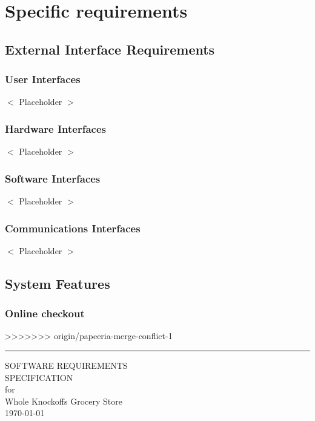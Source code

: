 \documentclass{scrreprt}
\theoremstyle{funreq}
\def\myversion{1.0 }
\begin{document}
{\let\clearpage\relax 
\chapter{Specific requirements}}

\section{External Interface Requirements}

\subsection{User Interfaces}
$<$ Placeholder $>$

\subsection{Hardware Interfaces}
$<$ Placeholder $>$

\subsection{Software Interfaces}
$<$ Placeholder $>$

\subsection{Communications Interfaces}
$<$ Placeholder $>$

\section{System Features}



\subsection{Online checkout}


>>>>>>> origin/papeeria-merge-conflict-1
	
	\begin{flushright}
		\rule{16cm}{5pt}\vskip1cm
		\begin{bfseries}
			\Huge{SOFTWARE REQUIREMENTS\\ SPECIFICATION}\\
			\vspace{1.9cm}
			for\\
			\vspace{1.9cm}
			Whole Knockoffs Grocery Store\\
			\vspace{1.9cm}
			\today\\
		\end{bfseries}
	\end{flushright}
	
\end{document}
